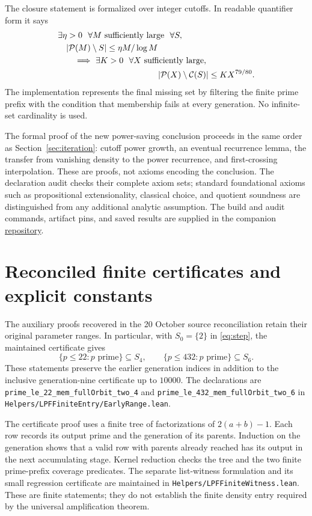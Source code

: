 \documentclass[11pt]{article}
\theoremstyle{definition}
\theoremstyle{remark}
\newcommand{\PP}{\mathcal P}
\newcommand{\Cl}{\mathcal C}
\newcommand{\card}[1]{\lvert #1\rvert}
\newcommand{\lean}[1]{\nolinkurl{#1}}
\begin{document}
The closure statement is formalized over integer cutoffs. In readable
quantifier form it says
\[
\begin{aligned}
 &\exists\eta>0\ \ \forall M\text{ sufficiently large}\ \ \forall S,\\
 &\quad \card{\PP(M)\setminus S}\le\eta M/\log M\\
 &\qquad\Longrightarrow\
   \exists K>0\ \ \forall X\text{ sufficiently large},\\
 &\hspace{42mm}\card{\PP(X)\setminus\Cl(S)}\le KX^{79/80}.
\end{aligned}
\]
The implementation represents the final missing set by filtering the finite
prime prefix with the condition that membership fails at every generation.
No infinite-set cardinality is used.

The formal proof of the new power-saving conclusion proceeds in the same
order as Section~\ref{sec:iteration}: cutoff power growth, an eventual
recurrence lemma, the transfer from vanishing density to the power
recurrence, and first-crossing interpolation. These are proofs, not axioms
encoding the conclusion. The declaration audit checks their complete
axiom sets; standard foundational axioms such as propositional
extensionality, classical choice, and quotient soundness are distinguished
from any additional analytic assumption. The build and audit commands,
artifact pins, and saved results are supplied in the companion
\href{https://github.com/kimihiro64/prime-factor-oscillations}{repository}.

\section{Reconciled finite certificates and explicit constants}

The auxiliary proofs recovered in the 20 October source reconciliation
retain their original parameter ranges. In particular, with \(S_0=\{2\}\)
in \eqref{eq:step}, the maintained certificate gives
\[
 \{p\le22:p\text{ prime}\}\subseteq S_4,\qquad
 \{p\le432:p\text{ prime}\}\subseteq S_6.
\]
These statements preserve the earlier generation indices in addition to
the inclusive generation-nine certificate up to \(10000\).
The declarations are
{\small\lean{prime_le_22_mem_fullOrbit_two_4}} and
{\small\lean{prime_le_432_mem_fullOrbit_two_6}} in
\lean{Helpers/LPFFiniteEntry/EarlyRange.lean}.

The certificate proof uses a finite tree of factorizations of
\(2(a+b)-1\). Each row records its output prime and the generation of
its parents. Induction on the generation shows that a valid row with
parents already reached has its output in the next accumulating stage.
Kernel reduction checks the tree and the two finite prime-prefix
coverage predicates. The separate list-witness formulation and its
small regression certificate are maintained in
\lean{Helpers/LPFFiniteWitness.lean}. These are finite statements;
they do not establish the finite density entry required by the
universal amplification theorem.
\end{document}
